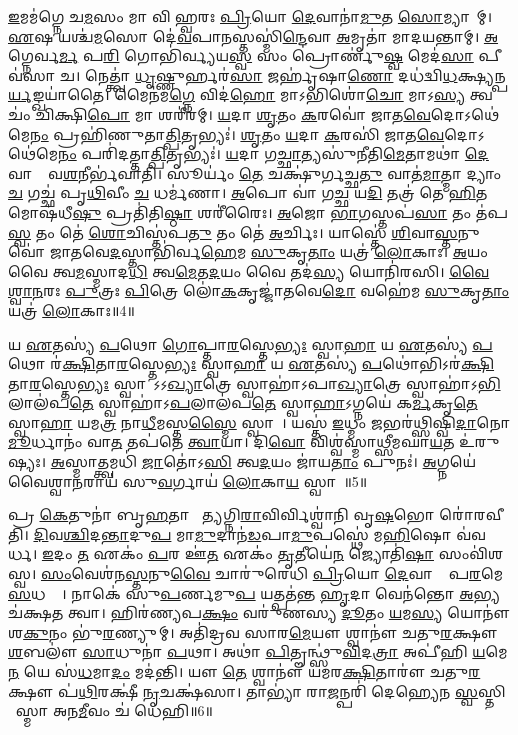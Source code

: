 \ul{𑌇}𑌮𑌮॑𑌗𑍍𑌨𑍇 𑌚\ul{𑌮}𑌸𑌂 𑌮𑌾 𑌵𑌿𑌜𑍀᳚𑌹𑍍𑌵𑌰𑌃 \ul{𑌪𑍍𑌰𑌿}𑌯𑍋 \ul{𑌦𑍇}𑌵𑌾𑌨𑌾॑\ul{𑌮𑍁}𑌤 \ul{𑌸𑍋}𑌮𑍍𑌯𑌾𑌨𑌾᳚𑌮𑍍। 
\ul{𑌏}𑌷 𑌯𑌶𑍍𑌚॑\ul{𑌮}𑌸𑍋 𑌦𑍇॑\ul{𑌵}𑌪𑌾\ul{𑌨}𑌸𑍍𑌤𑌸𑍍𑌮𑌿॑\ul{𑌨𑍍𑌦𑍇}𑌵𑌾 \ul{𑌅}𑌮𑍃𑌤𑌾॑ 𑌮𑌾𑌦𑌯𑌨𑍍𑌤𑌾𑌮𑍍। 
\ul{𑌅}𑌗𑍍𑌨𑍇𑌰𑍍𑌵\ul{𑌰𑍍𑌮} 𑌪\ul{𑌰𑌿} 𑌗𑍋𑌭𑌿॑𑌰𑍍𑌵𑍍𑌯𑌯\ul{𑌸𑍍𑌵} 𑌸𑌂 𑌪𑍍𑌰𑍋𑌰𑍍𑌣𑍁॑\ul{𑌷𑍍𑌵} 𑌮𑍇𑌦॑\ul{𑌸𑌾} 𑌪𑍀𑌵॑𑌸𑌾 𑌚। 
𑌨𑍇𑌤𑍍𑌤𑍍𑌵𑌾॑ \ul{𑌧𑍃}𑌷𑍍𑌣𑍁𑌰𑍍\mbox{}𑌹𑌰॑\ul{𑌸𑌾} 𑌜𑌰𑍍\mbox{}𑌹𑍃॑𑌷𑌾\ul{𑌣𑍋} 𑌦𑌧॑𑌦𑍍𑌵𑌿\ul{𑌧}𑌕𑍍𑌷𑍍𑌯𑌨𑍍𑌪\ul{𑌰𑍍𑌯}𑌙𑍍𑌖𑌯𑌾॑𑌤𑍈। 
𑌮𑍈𑌨॑𑌮\ul{𑌗𑍍𑌨𑍇} 𑌵𑌿𑌦॑\ul{𑌹𑍋} 𑌮𑌾𑌽𑌭𑌿𑌶𑍋॑\ul{𑌚𑍋} 𑌮𑌾𑌽\ul{𑌸𑍍𑌯} 𑌤𑍍𑌵𑌚𑌂॑ 𑌚𑌿𑌕𑍍𑌷𑌿\ul{𑌪𑍋} 𑌮𑌾 𑌶𑌰𑍀॑𑌰𑌮𑍍। 
\ul{𑌯}𑌦𑌾 \ul{𑌶𑍃}𑌤𑌂 \ul{𑌕}𑌰𑌵𑍋॑ 𑌜𑌾𑌤\ul{𑌵𑍇}𑌦𑍋𑌽𑌥𑍇॑𑌮𑍇\ul{𑌨𑌂} 𑌪𑍍𑌰𑌹𑌿॑𑌣𑍁𑌤𑌾\ul{𑌤𑍍𑌪𑌿}𑌤𑍃𑌭𑍍𑌯𑌃॑। 
\ul{𑌶𑍃}𑌤𑌂 \ul{𑌯}𑌦𑌾 \ul{𑌕}𑌰𑌸𑌿॑ 𑌜𑌾𑌤\ul{𑌵𑍇}𑌦𑍋𑌽𑌥𑍇॑𑌮𑍇\ul{𑌨𑌂} 𑌪𑌰𑌿॑𑌦𑌤𑍍𑌤𑌾\ul{𑌤𑍍𑌪𑌿}𑌤𑍃𑌭𑍍𑌯𑌃॑। 
\ul{𑌯}𑌦𑌾 𑌗\ul{𑌚𑍍𑌛𑌾}𑌤𑍍𑌯𑌸𑍁॑𑌨𑍀𑌤𑌿\ul{𑌮𑍇}𑌤𑌾𑌮𑌥𑌾॑ \ul{𑌦𑍇}𑌵𑌾𑌨𑌾𑌂᳚ 𑌵\ul{𑌶}𑌨𑍀𑌰𑍍𑌭॑𑌵𑌾𑌤𑌿। 
𑌸𑍂𑌰𑍍𑌯𑌂॑ \ul{𑌤𑍇} 𑌚𑌕𑍍𑌷𑍁॑𑌰𑍍𑌗𑌚𑍍𑌛\ul{𑌤𑍁} 𑌵𑌾𑌤॑\ul{𑌮𑌾}𑌤𑍍𑌮𑌾 𑌦𑍍𑌯𑌾𑌂 \ul{𑌚} 𑌗𑌚𑍍𑌛॑ 𑌪𑍃\ul{𑌥𑌿}𑌵𑍀𑌂 \ul{𑌚} 𑌧𑌰𑍍𑌮॑𑌣𑌾। 
\ul{𑌅}𑌪𑍋 𑌵𑌾॑ 𑌗\ul{𑌚𑍍𑌛} 𑌯\ul{𑌦𑌿} 𑌤𑌤𑍍𑌰॑ 𑌤𑍇 \ul{𑌹𑌿}𑌤𑌮𑍋𑌷॑𑌧𑍀\ul{𑌷𑍁} 𑌪𑍍𑌰𑌤𑌿॑𑌤𑌿\ul{𑌷𑍍𑌠𑌾} 𑌶𑌰𑍀॑𑌰𑍈𑌃। 
\ul{𑌅}𑌜𑍋 \ul{𑌭𑌾}𑌗𑌸𑍍𑌤𑌪॑\ul{𑌸𑌾} 𑌤𑌂 𑌤॑𑌪\ul{𑌸𑍍𑌵} 𑌤𑌂 𑌤𑍇॑ \ul{𑌶𑍋}𑌚𑌿𑌸𑍍𑌤॑𑌪\ul{𑌤𑍁} 𑌤𑌂 𑌤𑍇॑ \ul{𑌅}𑌰𑍍𑌚𑌿𑌃। 
𑌯𑌾𑌸𑍍𑌤𑍇॑ \ul{𑌶𑌿}𑌵𑌾\ul{𑌸𑍍𑌤}𑌨𑍁𑌵𑍋॑ 𑌜𑌾𑌤𑌵𑍇\ul{𑌦}𑌸𑍍𑌤𑌾𑌭𑌿॑𑌰𑍍𑌵\ul{𑌹𑍇}𑌮 \ul{𑌸𑍁}𑌕𑍃\ul{𑌤𑌾𑌂} 𑌯𑌤𑍍𑌰॑ \ul{𑌲𑍋}𑌕𑌾𑌃। 
\ul{𑌅}𑌯𑌂 𑌵𑍈 𑌤𑍍𑌵\ul{𑌮}𑌸𑍍𑌮𑌾𑌦\ul{𑌧𑌿} 𑌤𑍍𑌵\ul{𑌮𑍇}𑌤\ul{𑌦}𑌯𑌂 𑌵𑍈 𑌤𑌦॑\ul{𑌸𑍍𑌯} 𑌯𑍋𑌨𑌿॑𑌰𑌸𑌿। 
\ul{𑌵𑍈}\ul{𑌶𑍍𑌵𑌾}\ul{𑌨}𑌰𑌃 \ul{𑌪𑍁}𑌤𑍍𑌰𑌃 \ul{𑌪𑌿}𑌤𑍍𑌰𑍇 𑌲𑍋॑\ul{𑌕}𑌕𑍃𑌜𑍍𑌜𑌾॑𑌤𑌵𑍇\ul{𑌦𑍋} 𑌵𑌹𑍇॑𑌮 \ul{𑌸𑍁}𑌕𑍃\ul{𑌤𑌾𑌂} 𑌯𑌤𑍍𑌰॑ \ul{𑌲𑍋}𑌕𑌾𑌃॥4॥
\anuvakamend[\ul{𑌵𑌿}𑌦𑍍𑌵𑌾\ul{𑌨}𑌭𑍍𑌯𑌾𑌵॑𑌵𑍃\ul{𑌥𑍍𑌸𑍍𑌵𑌾}𑌭𑌿𑌮𑌾॑𑌤𑍀𑌰𑍍𑌜𑌯𑍇\ul{𑌮} 𑌶𑌰𑍀॑𑌰𑍈\ul{𑌶𑍍𑌚}𑌤𑍍𑌵𑌾𑌰𑌿॑ 𑌚]

𑌯 \ul{𑌏}𑌤𑌸𑍍𑌯॑ \ul{𑌪}𑌥𑍋 \ul{𑌗𑍋}𑌪𑍍𑌤𑌾\ul{𑌰}𑌸𑍍𑌤𑍇\ul{𑌭𑍍𑌯𑌃} 𑌸𑍍𑌵𑌾\ul{𑌹𑌾} 𑌯 \ul{𑌏}𑌤𑌸𑍍𑌯॑ \ul{𑌪}𑌥𑍋 𑌰॑\ul{𑌕𑍍𑌷𑌿}𑌤𑌾\ul{𑌰}𑌸𑍍𑌤𑍇\ul{𑌭𑍍𑌯𑌃} 𑌸𑍍𑌵𑌾\ul{𑌹𑌾} 𑌯 \ul{𑌏}𑌤𑌸𑍍𑌯॑ \ul{𑌪}𑌥𑍋॑𑌭𑌿𑌽𑌰॑\ul{𑌕𑍍𑌷𑌿}𑌤𑌾\ul{𑌰}𑌸𑍍𑌤𑍇\ul{𑌭𑍍𑌯𑌃} 𑌸𑍍𑌵𑌾𑌹𑌾᳚𑌽𑌽\ul{𑌖𑍍𑌯𑌾}𑌤𑍍𑌰𑍇 𑌸𑍍𑌵𑌾𑌹𑌾॑𑌽𑌪𑌾\ul{𑌖𑍍𑌯𑌾}𑌤𑍍𑌰𑍇 𑌸𑍍𑌵𑌾𑌹𑌾॑𑌽\ul{𑌭𑌿}𑌲𑌾𑌲॑𑌪\ul{𑌤𑍇} 𑌸𑍍𑌵𑌾𑌹𑌾॑𑌽\ul{𑌪}𑌲𑌾𑌲॑𑌪\ul{𑌤𑍇} 𑌸𑍍𑌵𑌾\ul{𑌹𑌾}𑌽𑌗𑍍𑌨𑌯𑍇॑ 𑌕\ul{𑌰𑍍𑌮}𑌕𑍃\ul{𑌤𑍇} 𑌸𑍍𑌵𑌾\ul{𑌹𑌾} 𑌯𑌮\ul{𑌤𑍍𑌰} 𑌨𑌾\ul{𑌧𑍀}𑌮𑌸𑍍𑌤\ul{𑌸𑍍𑌮𑍈} 𑌸𑍍𑌵𑌾𑌹𑌾᳚। 
𑌯𑌸𑍍𑌤॑ \ul{𑌇}𑌧𑍍𑌮𑌂 \ul{𑌜}𑌭𑌰॑𑌥𑍍𑌸𑌿𑌷𑍍𑌵𑌿\ul{𑌦𑌾}𑌨𑍋 \ul{𑌮𑍂}𑌰𑍍𑌧𑌾𑌨𑌂॑ 𑌵𑌾\ul{𑌤} 𑌤𑌪॑𑌤𑍇 \ul{𑌤𑍍𑌵𑌾}𑌯𑌾। 
𑌦𑌿\ul{𑌵𑍋} 𑌵𑌿𑌶𑍍𑌵॑𑌸𑍍𑌮𑌾𑌥𑍍𑌸𑍀𑌮𑌘𑌾\ul{𑌯}𑌤 𑌉॑𑌰𑍁𑌷𑍍𑌯𑌃। 
\ul{𑌅}𑌸𑍍𑌮𑌾𑌤𑍍𑌤𑍍𑌵𑌮𑌧𑌿॑ \ul{𑌜𑌾}𑌤𑍋॑𑌽\ul{𑌸𑌿} 𑌤𑍍𑌵\ul{𑌦}𑌯𑌂 𑌜𑌾॑𑌯\ul{𑌤𑌾𑌂} 𑌪𑍁𑌨𑌃॑। 
\ul{𑌅}𑌗𑍍𑌨𑌯𑍇॑ 𑌵𑍈𑌶𑍍𑌵𑌾\ul{𑌨}𑌰𑌾𑌯॑ 𑌸𑍁\ul{𑌵}𑌰𑍍𑌗𑌾𑌯॑ \ul{𑌲𑍋}𑌕𑌾\ul{𑌯} 𑌸𑍍𑌵𑌾𑌹𑌾᳚॥5॥
\anuvakamend[𑌯 \ul{𑌏}𑌤\ul{𑌸𑍍𑌯} 𑌤𑍍𑌵𑌤𑍍𑌪𑌞𑍍𑌚॑]

𑌪𑍍𑌰 \ul{𑌕𑍇}𑌤𑍁𑌨𑌾॑ 𑌬𑍃\ul{𑌹}𑌤𑌾 𑌭𑌾᳚\ul{𑌤𑍍𑌯}𑌗𑍍𑌨𑌿\ul{𑌰𑌾}𑌵𑌿𑌰𑍍𑌵𑌿𑌶𑍍𑌵𑌾॑𑌨𑌿 𑌵𑍃\ul{𑌷}𑌭𑍋 𑌰𑍋॑𑌰𑌵𑍀𑌤𑌿। 
\ul{𑌦𑌿}𑌵\ul{𑌶𑍍𑌚𑌿}𑌦\ul{𑌨𑍍𑌤𑌾}𑌦𑍁\ul{𑌪} 𑌮𑌾\ul{𑌮𑍁}𑌦𑌾𑌨॑\ul{𑌡}𑌪𑌾\ul{𑌮𑍁}𑌪𑌸𑍍𑌥𑍇॑ 𑌮\ul{𑌹𑌿}𑌷𑍋 𑌵॑𑌵𑌰𑍍𑌧। 
\ul{𑌇}𑌦𑌂 \ul{𑌤} 𑌏𑌕𑌂॑ \ul{𑌪}𑌰 𑌊॑\ul{𑌤} 𑌏𑌕𑌂॑ \ul{𑌤𑍃}𑌤𑍀𑌯𑍇॑\ul{𑌨} 𑌜𑍍𑌯𑍋𑌤𑌿॑\ul{𑌷𑌾} 𑌸𑌂𑌵𑌿॑𑌶𑌸𑍍𑌵। 
\ul{𑌸𑌂}𑌵𑍇𑌶॑𑌨\ul{𑌸𑍍𑌤}𑌨𑍁\ul{𑌵𑍈} 𑌚𑌾𑌰𑍁॑𑌰𑍇𑌧𑌿 \ul{𑌪𑍍𑌰𑌿}𑌯𑍋 \ul{𑌦𑍇}𑌵𑌾𑌨𑌾𑌂᳚ 𑌪\ul{𑌰}𑌮𑍇 \ul{𑌸}𑌧𑌸𑍍𑌥𑍇᳚। 
𑌨𑌾𑌕𑍇॑ 𑌸𑍁\ul{𑌪}𑌰𑍍𑌣𑌮𑍁\ul{𑌪} 𑌯𑌤𑍍𑌪𑌤॑𑌨𑍍𑌤 \ul{𑌹𑍃}𑌦𑌾 𑌵𑍇𑌨॑𑌨𑍍𑌤𑍋 \ul{𑌅}𑌭𑍍𑌯𑌚॑𑌕𑍍𑌷𑌤 𑌤𑍍𑌵𑌾। 
𑌹𑌿𑌰॑𑌣𑍍𑌯𑌪\ul{𑌕𑍍𑌷𑌂} 𑌵𑌰𑍁॑𑌣𑌸𑍍𑌯 \ul{𑌦𑍂}𑌤𑌂 \ul{𑌯}𑌮\ul{𑌸𑍍𑌯} 𑌯𑍋𑌨𑍗॑ 𑌶\ul{𑌕𑍁}𑌨𑌂 𑌭𑍁॑\ul{𑌰}𑌣𑍍𑌯𑍁𑌮𑍍। 
𑌅𑌤𑌿॑𑌦𑍍𑌰𑌵 𑌸𑌾𑌰\ul{𑌮𑍇}𑌯𑍗 𑌶𑍍𑌵𑌾𑌨𑍗॑ 𑌚𑌤𑍁\ul{𑌰}𑌕𑍍𑌷𑍗 \ul{𑌶}𑌬𑌲𑍗॑ \ul{𑌸𑌾}𑌧𑍁𑌨𑌾॑ \ul{𑌪}𑌥𑌾। 
𑌅𑌥𑌾॑ \ul{𑌪𑌿}𑌤𑍄𑌨𑍍𑌥𑍍𑌸𑍁॑\ul{𑌵𑌿}𑌦\ul{𑌤𑍍𑌰𑌾}\ul{} 𑌅𑌪𑍀॑𑌹𑌿 \ul{𑌯}𑌮𑍇\ul{𑌨} 𑌯𑍇 𑌸॑\ul{𑌧}𑌮𑌾\ul{𑌦𑌂} 𑌮𑌦॑𑌨𑍍𑌤𑌿। 
𑌯𑍗 \ul{𑌤𑍇} 𑌶𑍍𑌵𑌾𑌨𑍗॑ 𑌯𑌮𑌰\ul{𑌕𑍍𑌷𑌿}𑌤𑌾𑌰𑍗॑ 𑌚𑌤𑍁\ul{𑌰}𑌕𑍍𑌷𑍗 𑌪॑\ul{𑌥𑌿}𑌰𑌕𑍍𑌷𑍀॑ \ul{𑌨𑍃}𑌚𑌕𑍍𑌷॑𑌸𑌾। 
𑌤𑌾𑌭𑍍𑌯𑌾॑ 𑌰𑌾\ul{𑌜}𑌨𑍍𑌪𑌰𑌿॑ 𑌦𑍇𑌹𑍍𑌯𑍇𑌨 \ul{𑌸𑍍𑌵}𑌸𑍍𑌤𑌿 𑌚𑌾᳚𑌸𑍍𑌮𑌾 𑌅𑌨\ul{𑌮𑍀}𑌵𑌂 𑌚॑ 𑌧𑍇𑌹𑌿॥6॥

